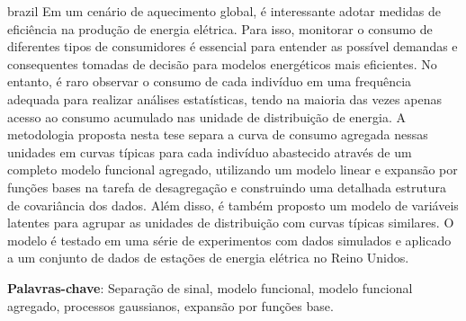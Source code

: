 \setlength{\absparsep}{18pt} %
\begin{resumo}[Resumo]
  \begin{otherlanguage*}{brazil}
    Em um cenário de aquecimento global, é interessante adotar medidas de eficiência na produção de energia elétrica. Para isso, monitorar o consumo de diferentes tipos de consumidores é essencial para entender as possível demandas e consequentes tomadas de decisão para modelos energéticos mais eficientes. No entanto, é raro observar o consumo de cada indivíduo em uma frequência adequada para realizar análises estatísticas, tendo na maioria das vezes apenas acesso ao consumo acumulado nas unidade de distribuição de energia. A metodologia proposta nesta tese separa a curva de consumo agregada nessas unidades em curvas típicas para cada indivíduo abastecido através de um completo modelo funcional agregado, utilizando um modelo linear e expansão por funções bases na tarefa de desagregação e construindo uma detalhada estrutura de covariância dos dados. Além disso, é também proposto um modelo de variáveis latentes para agrupar as unidades de distribuição com curvas típicas similares. O modelo é testado em uma série de experimentos com dados simulados e aplicado a um conjunto de dados de estações de energia elétrica no Reino Unidos. 

    \textbf{Palavras-chave}: Separação de sinal, modelo funcional, modelo funcional agregado, processos gaussianos, expansão por funções base.
 \end{otherlanguage*}
\end{resumo}
